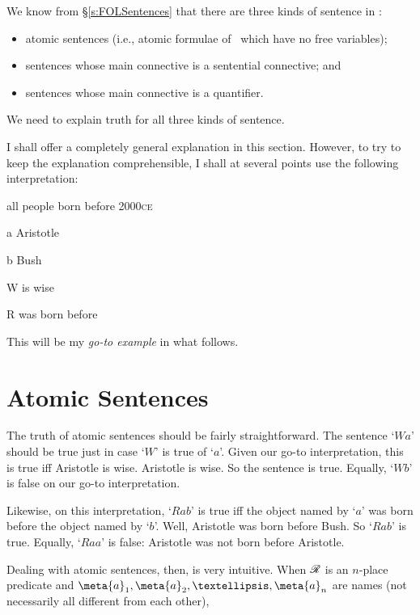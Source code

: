 We know from §\ref{s:FOLSentences} that there are three kinds of sentence in \FOL: 
	\begin{itemize}
		\item atomic sentences (i.e., atomic formulae of \FOL\ which have no free variables);
		\item sentences whose main connective is a sentential connective; and
		\item sentences whose main connective is a quantifier.
	\end{itemize}
We need to explain truth for all three kinds of sentence.

I shall offer a completely general explanation in this section. However, to try to keep the explanation comprehensible, I shall at several points use the following interpretation:
	\begin{ekey}
		\item[\text{domain}] all people born before 2000\textsc{ce}
		\item[a] Aristotle
		\item[b] Bush
		\item[W]  is wise
		\item[R]  was born before 
	\end{ekey}
This will be my \emph{go-to example} in what follows.

\section{Atomic Sentences}\label{fol.truth.atom}
The truth of atomic sentences should be fairly straightforward. The sentence `$Wa$' should be true just in case `$W$' is true of `$a$'. Given our go-to interpretation, this is true iff Aristotle is wise. Aristotle is wise. So the sentence is true. Equally, `$Wb$' is false on our go-to interpretation.

Likewise, on this interpretation, `$Rab$' is true iff the object named by `$a$' was born before the object named by `$b$'. Well, Aristotle was born before Bush. So `$Rab$' is true. Equally, `$Raa$' is false: Aristotle was not born before Aristotle. 

Dealing with atomic sentences, then, is very intuitive. When $\mathscr{R}$ is an $n$-place predicate and $\meta{a}_{1}, \meta{a}_{2}, …, \meta{a}_{n}$ are names (not necessarily all different from each other), 


